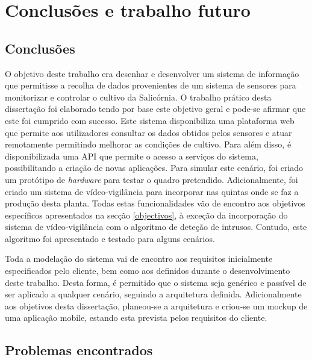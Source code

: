 \chapter{Conclusões e trabalho futuro}


\section{Conclusões}



O objetivo deste trabalho era desenhar e desenvolver um sistema de informação que permitisse a recolha de dados provenientes de um sistema de sensores para monitorizar e controlar o cultivo da Salicórnia. O trabalho prático desta dissertação foi elaborado tendo por base este objetivo geral e pode-se afirmar que este foi cumprido com sucesso. Este sistema disponibiliza uma plataforma web que permite aos utilizadores consultar os dados obtidos pelos sensores e atuar remotamente permitindo melhorar as condições de cultivo. Para além disso, é disponibilizada uma \ac{API} que permite o acesso a serviços do sistema, possibilitando a criação de novas aplicações. Para simular este cenário, foi criado um protótipo de \textit{hardware} para testar o quadro pretendido. Adicionalmente, foi criado um sistema de vídeo-vigilância para incorporar nas quintas onde se faz a produção desta planta. Todas estas funcionalidades vão de encontro aos objetivos específicos apresentados na secção \ref{objectivos}, à exceção da incorporação do sistema de vídeo-vigilância com o algoritmo de deteção de intrusos. Contudo, este algoritmo foi apresentado e testado para alguns cenários. 

Toda a modelação do sistema vai de encontro aos requisitos inicialmente especificados pelo cliente, bem como aos definidos durante o desenvolvimento deste trabalho. Desta forma, é permitido que o sistema seja genérico e passível de ser aplicado a qualquer cenário, seguindo a arquitetura definida. Adicionalmente aos objetivos desta dissertação, planeou-se a arquitetura e criou-se um mockup de uma aplicação mobile, estando esta prevista pelos requisitos do cliente. 




\section{Problemas encontrados}



